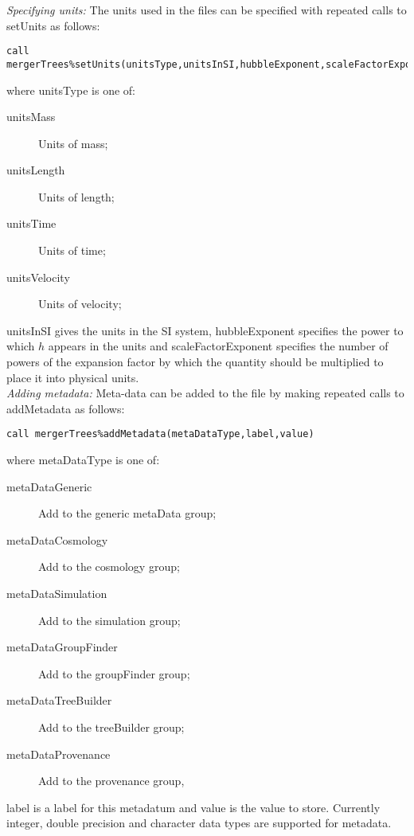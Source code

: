 \noindent \emph{Specifying units:} The units used in the files can be specified with repeated calls to {\normalfont \ttfamily setUnits} as follows:
\begin{verbatim}
call mergerTrees%setUnits(unitsType,unitsInSI,hubbleExponent,scaleFactorExponent)
\end{verbatim}
where {\normalfont \ttfamily unitsType} is one of:
\begin{description}
 \item [{\normalfont \ttfamily unitsMass}] Units of mass;
 \item [{\normalfont \ttfamily unitsLength}] Units of length;
 \item [{\normalfont \ttfamily unitsTime}] Units of time;
 \item [{\normalfont \ttfamily unitsVelocity}] Units of velocity;
\end{description}
{\normalfont \ttfamily unitsInSI} gives the units in the SI system, {\normalfont \ttfamily hubbleExponent} specifies the power to which $h$ appears in the units and {\normalfont \ttfamily scaleFactorExponent} specifies the number of powers of the expansion factor by which the quantity should be multiplied to place it into physical units.\\

\noindent \emph{Adding metadata:} Meta-data can be added to the file by making repeated calls to {\normalfont \ttfamily addMetadata} as follows:
\begin{verbatim}
call mergerTrees%addMetadata(metaDataType,label,value)
\end{verbatim}
where {\normalfont \ttfamily metaDataType} is one of:
\begin{description}
 \item [{\normalfont \ttfamily metaDataGeneric}] Add to the generic {\normalfont \ttfamily metaData} group;
 \item [{\normalfont \ttfamily metaDataCosmology}] Add to the {\normalfont \ttfamily cosmology} group;
 \item [{\normalfont \ttfamily metaDataSimulation}] Add to the {\normalfont \ttfamily simulation} group;
 \item [{\normalfont \ttfamily metaDataGroupFinder}] Add to the {\normalfont \ttfamily groupFinder} group;
 \item [{\normalfont \ttfamily metaDataTreeBuilder}] Add to the {\normalfont \ttfamily treeBuilder} group;
 \item [{\normalfont \ttfamily metaDataProvenance}] Add to the {\normalfont \ttfamily provenance} group,
\end{description}
{\normalfont \ttfamily label} is a label for this metadatum and {\normalfont \ttfamily value} is the value to store. Currently integer, double precision and character data types are supported for metadata.\\

